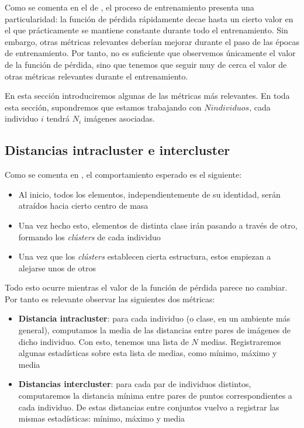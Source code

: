 Como se comenta en el  de \cite{informatica:principal}, el proceso de entrenamiento presenta una particularidad: la función de pérdida rápidamente decae hasta un cierto valor en el que prácticamente se mantiene constante durante todo el entrenamiento. Sin embargo, otras métricas relevantes deberían mejorar durante el paso de las épocas de entrenamiento. Por tanto, no es suficiente que observemos únicamente el valor de la función de pérdida, sino que tenemos que seguir muy de cerca el valor de otras métricas relevantes durante el entrenamiento.

En esta sección introduciremos algunas de las métricas más relevantes. En toda esta sección, supondremos que estamos trabajando con $N individuos$, cada individuo $i$ tendrá $N_i$ imágenes asociadas.

\subsection{Distancias intracluster e intercluster}

Como se comenta en \cite{informatica:paper_cacd}, el comportamiento esperado es el siguiente:

\begin{itemize}
    \item Al inicio, todos los elementos, independientemente de su identidad, serán atraídos hacia cierto centro de masa
    \item Una vez hecho esto, elementos de distinta clase irán pasando a través de otro, formando los \textit{clústers} de cada individuo
    \item Una vez que los \textit{clústers} establecen cierta estructura, estos empiezan a alejarse unos de otros
\end{itemize}

Todo esto ocurre mientras el valor de la función de pérdida parece no cambiar. Por tanto es relevante observar las siguientes dos métricas:

\begin{itemize}
    \item \textbf{Distancia intracluster}: para cada individuo (o clase, en un ambiente más general), computamos la media de las distancias entre pares de imágenes de dicho individuo. Con esto, tenemos una lista de $N$ medias. Registraremos algunas estadísticas sobre esta lista de medias, como mínimo, máximo y media
    \item \textbf{Distancias intercluster}: para cada par de individuos distintos, computaremos la distancia mínima entre pares de puntos correspondientes a cada individuo. De estas distancias entre conjuntos vuelvo a registrar las mismas estadísticas: mínimo, máximo y media
\end{itemize}


